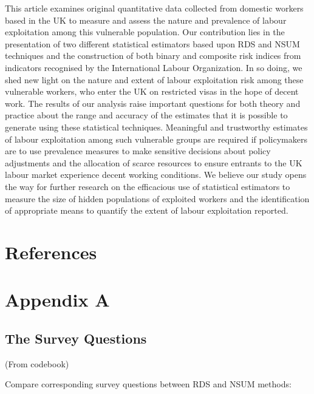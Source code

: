 \documentclass[
  12pt,
  letterpaper,
  DIV=11,
  numbers=noendperiod]{scrartcl}
\theoremstyle{plain}
\theoremstyle{definition}
\begin{document}
This article examines original quantitative data collected from domestic
workers based in the UK to measure and assess the nature and prevalence
of labour exploitation among this vulnerable population. Our
contribution lies in the presentation of two different statistical
estimators based upon RDS and NSUM techniques and the construction of
both binary and composite risk indices from indicators recognised by the
International Labour Organization. In so doing, we shed new light on the
nature and extent of labour exploitation risk among these vulnerable
workers, who enter the UK on restricted visas in the hope of decent
work. The results of our analysis raise important questions for both
theory and practice about the range and accuracy of the estimates that
it is possible to generate using these statistical techniques.
Meaningful and trustworthy estimates of labour exploitation among such
vulnerable groups are required if policymakers are to use prevalence
measures to make sensitive decisions about policy adjustments and the
allocation of scarce resources to ensure entrants to the UK labour
market experience decent working conditions. We believe our study opens
the way for further research on the efficacious use of statistical
estimators to measure the size of hidden populations of exploited
workers and the identification of appropriate means to quantify the
extent of labour exploitation reported.

\newpage

\newpage

\section{References}\label{references}

\printbibliography[heading=none]

\newpage

\appendix

\newpage

\section{Appendix A}\label{app-survey}

\subsection{The Survey Questions}\label{the-survey-questions}

(From codebook)

Compare corresponding survey questions between RDS and NSUM methods:
\end{document}
